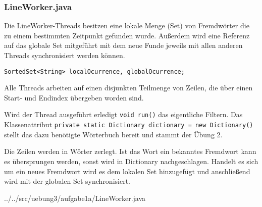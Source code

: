 \subsubsection*{LineWorker.java}

Die LineWorker-Threads besitzen eine lokale Menge (Set) von Fremdwörter die zu einem bestimmten Zeitpunkt gefunden wurde. Außerdem wird eine Referenz auf das globale Set mitgeführt mit dem neue Funde jeweils mit allen anderen Threads synchronisiert werden können.

\texttt{SortedSet<String> localOcurrence, globalOcurrence;}

Alle Threads arbeiten auf einen disjunkten Teilmenge von Zeilen, die über einen Start- und Endindex übergeben worden sind. 

Wird der Thread ausgeführt erledigt \texttt{void run()} das eigentliche Filtern.
Das Klassenattribut \texttt{private static Dictionary dictionary = new Dictionary()} stellt das dazu benötigte Wörterbuch bereit und stammt der Übung 2.

Die Zeilen werden in Wörter zerlegt. Ist das Wort ein bekanntes Fremdwort kann es übersprungen werden, sonst wird in Dictionary nachgeschlagen. Handelt es sich um ein neues Fremdwort wird es dem lokalen Set hinzugefügt und anschließend wird mit der globalen Set synchronisiert.


{../../src/uebung3/aufgabe1a/LineWorker.java}

